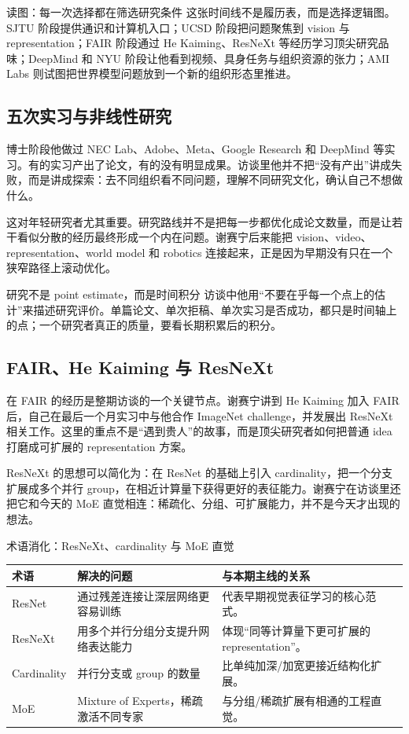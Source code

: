\documentclass[a4paper]{article}
\begin{document}
\begin{knowledgebox}{读图：每一次选择都在筛选研究条件}
这张时间线不是履历表，而是选择逻辑图。SJTU 阶段提供通识和计算机入口；UCSD 阶段把问题聚焦到 vision 与 representation；FAIR 阶段通过 He Kaiming、ResNeXt 等经历学习顶尖研究品味；DeepMind 和 NYU 阶段让他看到视频、具身任务与组织资源的张力；AMI Labs 则试图把世界模型问题放到一个新的组织形态里推进。
\end{knowledgebox}

\subsection{五次实习与非线性研究}

博士阶段他做过 NEC Lab、Adobe、Meta、Google Research 和 DeepMind 等实习。有的实习产出了论文，有的没有明显成果。访谈里他并不把“没有产出”讲成失败，而是讲成探索：去不同组织看不同问题，理解不同研究文化，确认自己不想做什么。

这对年轻研究者尤其重要。研究路线并不是把每一步都优化成论文数量，而是让若干看似分散的经历最终形成一个内在问题。谢赛宁后来能把 vision、video、representation、world model 和 robotics 连接起来，正是因为早期没有只在一个狭窄路径上滚动优化。

\begin{importantbox}{研究不是 point estimate，而是时间积分}
访谈中他用“不要在乎每一个点上的估计”来描述研究评价。单篇论文、单次拒稿、单次实习是否成功，都只是时间轴上的点；一个研究者真正的质量，要看长期积累后的积分。
\end{importantbox}

\subsection{FAIR、He Kaiming 与 ResNeXt}

在 FAIR 的经历是整期访谈的一个关键节点。谢赛宁讲到 He Kaiming 加入 FAIR 后，自己在最后一个月实习中与他合作 ImageNet challenge，并发展出 ResNeXt 相关工作。这里的重点不是“遇到贵人”的故事，而是顶尖研究者如何把普通 idea 打磨成可扩展的 representation 方案。

ResNeXt 的思想可以简化为：在 ResNet 的基础上引入 cardinality，把一个分支扩展成多个并行 group，在相近计算量下获得更好的表征能力。谢赛宁在访谈里还把它和今天的 MoE 直觉相连：稀疏化、分组、可扩展能力，并不是今天才出现的想法。

\begin{knowledgebox}{术语消化：ResNeXt、cardinality 与 MoE 直觉}
\begin{tabularx}{\textwidth}{p{}p{}X}
\toprule
术语 & 解决的问题 & 与本期主线的关系 \\
\midrule
ResNet & 通过残差连接让深层网络更容易训练 & 代表早期视觉表征学习的核心范式。 \\
ResNeXt & 用多个并行分组分支提升网络表达能力 & 体现“同等计算量下更可扩展的 representation”。 \\
Cardinality & 并行分支或 group 的数量 & 比单纯加深/加宽更接近结构化扩展。 \\
MoE & Mixture of Experts，稀疏激活不同专家 & 与分组/稀疏扩展有相通的工程直觉。 \\
\bottomrule
\end{tabularx}
\end{knowledgebox}
\end{document}
